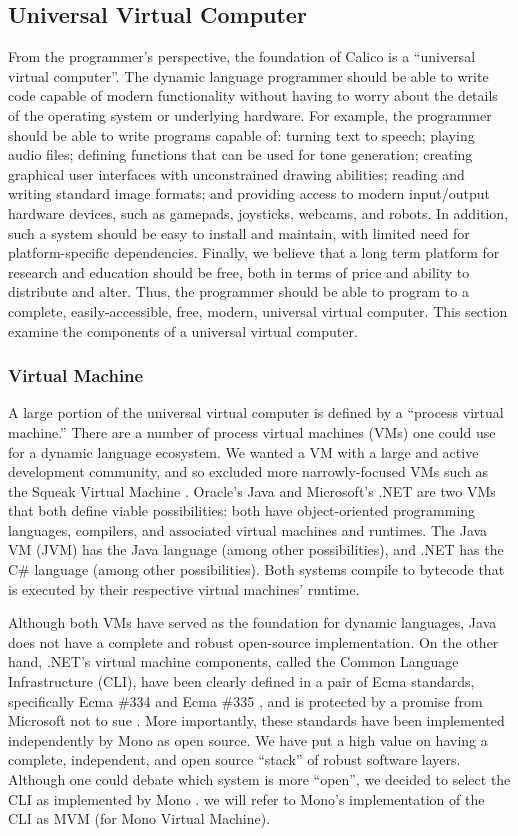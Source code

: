 \documentclass[preprint]{sigplanconf}
\begin{document}
\subsection{Universal Virtual Computer}

From the programmer's perspective, the foundation of Calico is a
``universal virtual computer''. The dynamic language programmer should
be able to write code capable of modern functionality without having
to worry about the details of the operating system or underlying
hardware. For example, the programmer should be able to write programs
capable of: turning text to speech; playing audio files; defining
functions that can be used for tone generation; creating graphical
user interfaces with unconstrained drawing abilities; reading and
writing standard image formats; and providing access to modern
input/output hardware devices, such as gamepads, joysticks, webcams,
and robots. In addition, such a system should be easy to install and
maintain, with limited need for platform-specific
dependencies. Finally, we believe that a long term platform for
research and education should be free, both in terms of price and
ability to distribute and alter. Thus, the programmer should be able
to program to a complete, easily-accessible, free, modern, universal
virtual computer. This section examine the components of a universal
virtual computer.

\subsubsection{Virtual Machine}

A large portion of the universal virtual computer is defined by a
``process virtual machine.'' There are a number of process virtual
machines (VMs) one could use for a dynamic language ecosystem. We
wanted a VM with a large and active development community, and so
excluded more narrowly-focused VMs such as the Squeak Virtual Machine
\cite{squeakvm}. Oracle's Java and Microsoft's .NET are two VMs that
both define viable possibilities: both have object-oriented
programming languages, compilers, and associated virtual machines and
runtimes. The Java VM (JVM) has the Java language (among other
possibilities), and .NET has the C\# language (among other
possibilities). Both systems compile to bytecode that is executed by
their respective virtual machines' runtime.

Although both VMs have served as the foundation for dynamic languages,
Java does not have a complete and robust open-source
implementation. On the other hand, .NET’s virtual machine components,
called the Common Language Infrastructure (CLI), have been clearly
defined in a pair of Ecma standards, specifically Ecma \#334 and Ecma
\#335 \cite{ecma-standards}, and is protected by a promise from
Microsoft not to sue \cite{microsoft-community-promise}. More
importantly, these standards have been implemented independently by
Mono as open source. We have put a high value on having a complete,
independent, and open source ``stack'' of robust software
layers. Although one could debate which system is more ``open'', we
decided to select the CLI as implemented by Mono \cite{mono}. we will
refer to Mono's implementation of the CLI as MVM (for Mono Virtual
Machine).
\end{document}
